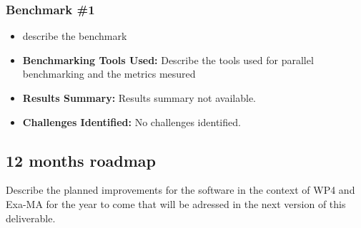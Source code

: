 \subsubsection{Benchmark \#1}
\begin{itemize}
    \item describe the benchmark
    \item \textbf{Benchmarking Tools Used:} Describe the tools used for parallel benchmarking and the metrics mesured
    \item \textbf{Results Summary:} Results summary not available.
    \item \textbf{Challenges Identified:} No challenges identified.
\end{itemize}

\subsection{12 months roadmap}
\label{sec:WP4:Hawen:roadmap}

Describe the planned improvements  for the software in the context of WP4 and Exa-MA for the year to come that will be adressed in the next version of this deliverable.